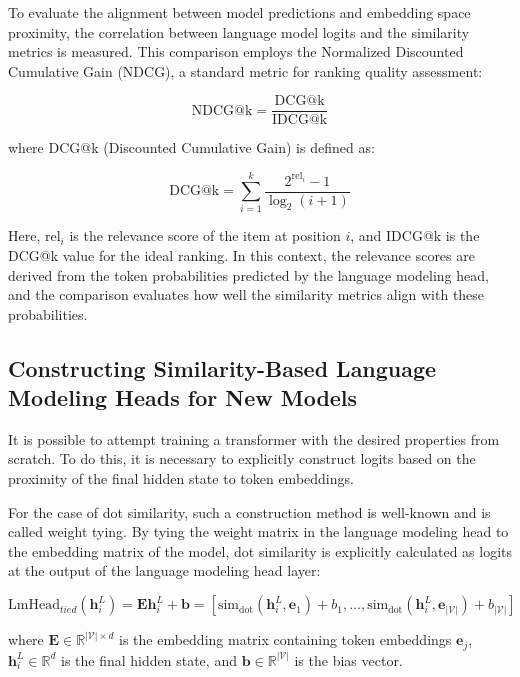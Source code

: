 To evaluate the alignment between model predictions and embedding space proximity, the correlation between language model logits and the similarity metrics is measured. This comparison employs the Normalized Discounted Cumulative Gain (NDCG), a standard metric for ranking quality assessment:

\begin{equation}
\text{NDCG@k} = \frac{\text{DCG@k}}{\text{IDCG@k}}
\end{equation}

where DCG@k (Discounted Cumulative Gain) is defined as:

\begin{equation}
\text{DCG@k} = \sum_{i=1}^{k} \frac{2^{\text{rel}_i} - 1}{\log_2(i+1)}
\end{equation}

Here, $\text{rel}_i$ is the relevance score of the item at position $i$, and IDCG@k is the DCG@k value for the ideal ranking. In this context, the relevance scores are derived from the token probabilities predicted by the language modeling head, and the comparison evaluates how well the similarity metrics align with these probabilities.

\subsection{Constructing Similarity-Based Language Modeling Heads for New Models}\label{scratch_final_hidden_info}

It is possible to attempt training a transformer with the desired properties from scratch. To do this, it is necessary to explicitly construct logits based on the proximity of the final hidden state to token embeddings.

For the case of dot similarity, such a construction method is well-known and is called weight tying. By tying the weight matrix in the language modeling head to the embedding matrix of the model, dot similarity is explicitly calculated as logits at the output of the language modeling head layer:

\begin{equation}
\text{LmHead}_{tied}(\mathbf{h}_i^L) = \mathbf{E} \mathbf{h}_i^L + \mathbf{b} = [\text{sim}_{\text{dot}}(\mathbf{h}_i^L, \mathbf{e}_1) + b_1, \ldots, \text{sim}_{\text{dot}}(\mathbf{h}_i^L, \mathbf{e}_{|\mathcal{V}|}) + b_{|\mathcal{V}|}]
\end{equation}

where $\mathbf{E} \in \mathbb{R}^{|\mathcal{V}| \times d}$ is the embedding matrix containing token embeddings $\mathbf{e}_j$, $\mathbf{h}_i^L \in \mathbb{R}^d$ is the final hidden state, and $\mathbf{b} \in \mathbb{R}^{|\mathcal{V}|}$ is the bias vector.

